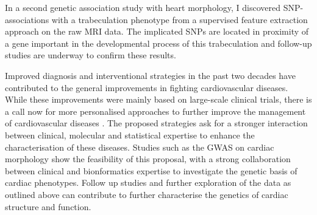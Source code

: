 In a second genetic association study with heart morphology, I discovered SNP-associations with a trabeculation phenotype from a supervised feature extraction approach on the raw MRI data. The implicated SNPs are located in proximity of a gene important in the developmental process of this trabeculation and follow-up studies are underway to confirm these results.

Improved diagnosis and interventional strategies in the past two decades have contributed to the general improvements in fighting cardiovascular diseases. While these improvements were mainly based on large-scale clinical trials, there is a call now for more personalised approaches to further improve the management of cardiovascular diseases \citep{Meder2016}. The proposed strategies ask for a stronger interaction between clinical, molecular and statistical expertise to enhance the characterisation of these diseases. Studies such as the GWAS on cardiac morphology show the feasibility of this proposal, with a strong collaboration between clinical and bionformatics expertise to investigate the genetic basis of cardiac phenotypes. Follow up studies and further exploration of the data  as outlined above can contribute to further characterise the genetics of cardiac structure and function. 



